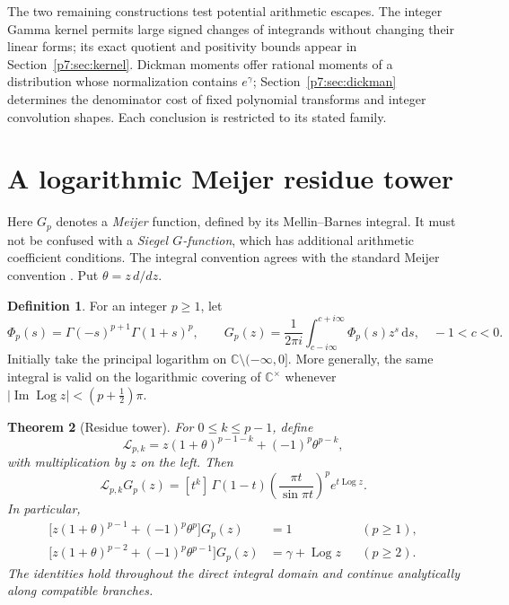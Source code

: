 \documentclass[11pt,a4paper]{article}
\newtheorem{theorem}{Theorem}[section]
\theoremstyle{definition}
\newtheorem{definition}[theorem]{Definition}
\theoremstyle{remark}
\newcommand{\C}{\mathbb C}
\newcommand{\dd}{\,\mathrm d}
\DeclareMathOperator{\Log}{Log}
\numberwithin{equation}{section}
\begin{document}
The two remaining constructions test potential arithmetic escapes.
The integer Gamma kernel permits large signed changes of integrands
without changing their linear forms; its exact quotient and positivity
bounds appear in Section~\ref{p7:sec:kernel}. Dickman moments offer rational
moments of a distribution whose normalization contains $e^\gamma$;
Section~\ref{p7:sec:dickman} determines the denominator cost of fixed
polynomial transforms and integer convolution shapes. Each conclusion is
restricted to its stated family.



\section{A logarithmic Meijer residue tower}
\label{p7:sec:residue}

Here $G_p$ denotes a \emph{Meijer} function, defined by its
Mellin--Barnes integral. It must not be confused with a \emph{Siegel
$G$-function}, which has additional arithmetic coefficient conditions.
The integral convention agrees with the standard Meijer convention
\cite{p7:DLMF16}. Put $\theta=z\,d/dz$.

\begin{definition}
For an integer $p\ge1$, let
\[
 \Phi_p(s)=\Gamma(-s)^{p+1}\Gamma(1+s)^p,\qquad
 G_p(z)=\frac1{2\pi i}\int_{c-i\infty}^{c+i\infty}
                  \Phi_p(s)z^s\dd s,\quad -1<c<0.
\]
Initially take the principal logarithm on $\C\setminus(-\infty,0]$.
More generally, the same integral is valid on the logarithmic covering
of $\C^\times$ whenever
$|\operatorname{Im}\Log z|<(p+\tfrac12)\pi$.
\end{definition}

\begin{theorem}[Residue tower]
\label{p7:thm:residue}
For $0\le k\le p-1$, define
\[
 \mathcal L_{p,k}
 =z(1+\theta)^{p-1-k}+(-1)^p\theta^{p-k},
\]
with multiplication by $z$ on the left. Then
\begin{equation}
\label{p7:eq:residue}
 \boxed{\quad
 \mathcal L_{p,k}G_p(z)
 =[t^k]\,
 \Gamma(1-t)\left(\frac{\pi t}{\sin\pi t}\right)^p
 e^{t\Log z}.
 \quad}
\end{equation}
In particular,
\begin{align}
 \bigl[z(1+\theta)^{p-1}+(-1)^p\theta^p\bigr]G_p(z)
 &=1 &&(p\ge1),\label{p7:eq:residue-one}\\
 \bigl[z(1+\theta)^{p-2}+(-1)^p\theta^{p-1}\bigr]G_p(z)
 &=\gamma+\Log z &&(p\ge2).\label{p7:eq:residue-gamma}
\end{align}
The identities hold throughout the direct integral domain and continue
analytically along compatible branches.
\end{theorem}
\end{document}
